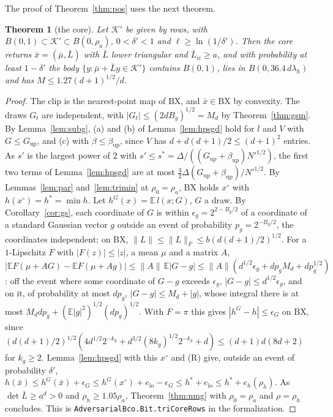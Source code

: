 \documentclass[11pt]{amsart}
\newtheorem{theorem}{Theorem}[section]
\theoremstyle{definition}
\numberwithin{equation}{section}
\newcommand{\E}{\mathbb{E}}
\newcommand{\cK}{\mathcal{K}}
\begin{document}
The proof of Theorem~\ref{thm:pos} uses the next theorem.

\begin{theorem}[the core]\label{thm:tricore}
Let $\cK'$ be given by rows, with $B(0,1)\subset\cK'\subset B(0,\rho_a)$, $0<\delta'<1$ and $\ell\ge\ln(1/\delta')$. Then the core returns $\bar x=(\bar\mu,\bar L)$ with $\bar L$ lower triangular and $\bar L_{ii}\ge a$, and with probability at least $1-\delta'$ the body $\{y:\bar\mu+\bar Ly\in\cK'\}$ contains $B(0,1)$, lies in $B(0,36.4\,d\lambda_h)$ and has $M\le1.27(d+1)^{1/2}/d$.
\end{theorem}

\begin{proof}
The clip is the nearest-point map of $\mathrm{BX}$, and $\bar x\in\mathrm{BX}$ by convexity. The draws $G_t$ are independent, with $|G_t|\le(2dB_g)^{1/2}=M_d$ by Theorem~\ref{thm:gsm}. By Lemma~\ref{lem:subg}, (a) and (b) of Lemma~\ref{lem:hpsgd} hold for $l$ and $V$ with $G\le G_{\mathrm{up}}$, and (c) with $\beta\le\beta_{\mathrm{up}}$, since $V$ has $d+d(d+1)/2\le(d+1)^2$ entries. As $s'$ is the largest power of $2$ with $s'\le s^*=\Delta/((G_{\mathrm{up}}+\beta_{\mathrm{up}})N'^{1/2})$, the first two terms of Lemma~\ref{lem:hpsgd} are at most $\frac32\Delta(G_{\mathrm{up}}+\beta_{\mathrm{up}})/N'^{1/2}$. By Lemmas~\ref{lem:par} and~\ref{lem:trimin} at $\rho_0=\rho_a$, $\mathrm{BX}$ holds $x^\circ$ with $h(x^\circ)=h^*=\min h$. Let $h^G(x)=\E\,l(x;G)$, $G$ a draw. By Corollary~\ref{cor:gs}, each coordinate of $G$ is within $\epsilon_g=2^{2-B_g/2}$ of a coordinate of a standard Gaussian vector $g$ outside an event of probability $p_g=2^{-B_g/2}$, the coordinates independent; on $\mathrm{BX}$, $\|L\|\le\|L\|_F\le b(d(d+1)/2)^{1/2}$. For a $1$-Lipschitz $F$ with $|F(z)|\le|z|$, a mean $\mu$ and a matrix $A$, $|\E F(\mu+AG)-\E F(\mu+Ag)|\le\|A\|\,\E|G-g|\le\|A\|(d^{1/2}\epsilon_g+dp_gM_d+dp_g^{1/2})$: off the event where some coordinate of $G-g$ exceeds $\epsilon_g$, $|G-g|\le d^{1/2}\epsilon_g$, and on it, of probability at most $dp_g$, $|G-g|\le M_d+|g|$, whose integral there is at most $M_ddp_g+(\E|g|^2)^{1/2}(dp_g)^{1/2}$. With $F=\pi$ this gives $|h^G-h|\le\epsilon_G$ on $\mathrm{BX}$, since $(d(d+1)/2)^{1/2}(4d^{1/2}2^{-k_g}+d^{3/2}(8k_g)^{1/2}2^{-k_g}+d)\le(d+1)d(8d+2)$ for $k_g\ge2$. Lemma~\ref{lem:hpsgd} with this $x^\circ$ and (R) give, outside an event of probability $\delta'$, $h(\bar x)\le h^G(\bar x)+\epsilon_G\le h^G(x^\circ)+e_{\mathrm{lo}}-\epsilon_G\le h^*+e_{\mathrm{lo}}\le h^*+e_h(\rho_h)$. As $\det\bar L\ge a^d>0$ and $\rho_h\ge1.05\rho_a$, Theorem~\ref{thm:nmg} with $\rho_0=\rho_a$ and $\rho=\rho_h$ concludes.
This is \texttt{AdversarialBco.Bit.triCoreRows} in the formalization.
\end{proof}
\end{document}
